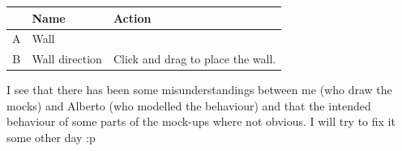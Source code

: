 \documentclass[12pt,a4paper]{article}
\begin{document}
\begin{table}[H]
\small
\centering
\begin{tabular}{c|p{5cm}|p{7cm}}
& Name & Action \\ \hline\hline
A
&Wall
&
\\B
&Wall direction
&Click and drag to place the wall.
\end{tabular}
\end{table}

\begin{todo}
I see that there has been some misunderstandings between me (who draw
the mocks) and Alberto (who modelled the behaviour) and that the
intended behaviour of some parts of the mock-ups where not obvious. I
will try to fix it some other day :p
\end{todo}

\newpage
\startappendix
\end{document}
